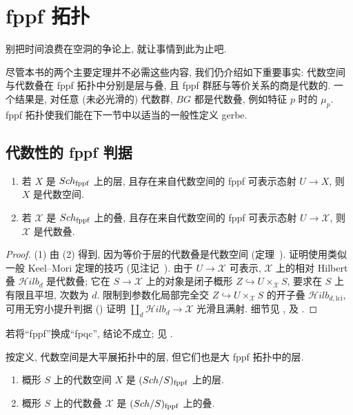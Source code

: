 \section{fppf 拓扑}\label{src:7.3}
\begin{epigraph}
别把时间浪费在空洞的争论上, 就让事情到此为止吧.
\end{epigraph}
尽管本书的两个主要定理并不必需这些内容, 我们仍介绍如下重要事实: 代数空间与代数叠在 fppf 拓扑中分别是层与叠, 且 fppf 群胚与等价关系的商是代数的. 一个结果是, 对任意 (未必光滑的) 代数群, $BG$ 都是代数叠, 例如特征 $p$ 时的 $\mu_p$. fppf 拓扑使我们能在下一节中以适当的一般性定义 gerbe.
\subsection{代数性的 fppf 判据}\label{src:7.3.1-subsection}
\begin{theorem}\label{src:7.3.1}
\begin{enumerate}[(1)]
\item 若 $X$ 是 $Sch_{\mathrm{fppf}}$ 上的层, 且存在来自代数空间的 fppf 可表示态射 $U\to X$, 则 $X$ 是代数空间.
\item 若 $\mathcal X$ 是 $Sch_{\mathrm{fppf}}$ 上的叠, 且存在来自代数空间的 fppf 可表示态射 $U\to\mathcal X$, 则 $\mathcal X$ 是代数叠.
\end{enumerate}
\end{theorem}
\begin{proof}
(1) 由 (2) 得到, 因为等价于层的代数叠是代数空间 (定理~). 证明使用类似一般 Keel--Mori 定理的技巧 (见注记~). 由于 $U\to\mathcal X$ 可表示, $\mathcal X$ 上的相对 Hilbert 叠 $\mathcal H\!ilb_d$ 是代数叠; 它在 $S\to\mathcal X$ 上的对象是闭子概形 $Z\hookrightarrow U\times_{\mathcal X}S$, 要求在 $S$ 上有限且平坦, 次数为 $d$. 限制到参数化局部完全交 $Z\hookrightarrow U\times_{\mathcal X}S$ 的开子叠 $\mathcal H\!ilb_{d,\mathrm{lci}}$, 可用无穷小提升判据 () 证明 $\coprod_d\mathcal H\!ilb_d\to\mathcal X$ 光滑且满射. 细节见 \cite[定理 6.1]{Art74b}, \cite[定理 10.1]{LMB00} 及 \cite[Tag 06DC]{SP}.
\end{proof}
\begin{remark}\label{src:7.3.2}
若将``fppf''换成``fpqc'', 结论不成立; 见 \cite{MO10}.
\end{remark}
按定义, 代数空间是大平展拓扑中的层, 但它们也是大 fppf 拓扑中的层.
\begin{corollary}\label{src:7.3.3}
\begin{enumerate}[(1)]
\item 概形 $S$ 上的代数空间 $X$ 是 $(Sch/S)_{\mathrm{fppf}}$ 上的层.
\item 概形 $S$ 上的代数叠 $\mathcal X$ 是 $(Sch/S)_{\mathrm{fppf}}$ 上的叠.
\end{enumerate}
\end{corollary}
